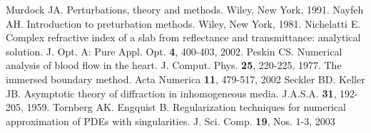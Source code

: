 \documentclass[12pt,twoside]{report}
\begin{document}
\begin{thebibliography}{2d}
Murdock JA. Perturbations, theory and methods. Wiley, New York, 1991.
Nayfeh AH. Introduction to preturbation methods. Wiley, New York, 1981.
Nichelatti E. Complex refractive index of a slab from reflectance and transmittance: analytical solution. J. Opt. A: Pure Appl. Opt. \textbf{4}, 400-403, 2002.
Peskin CS. Numerical analysis of blood flow in the heart. J. Comput. Phys. \textbf{25}, 220-225, 1977.
The immersed boundary method. Acta Numerica \textbf{11}, 479-517, 2002
Seckler BD. Keller JB. Asymptotic theory of diffraction in inhomogeneous media. J.A.S.A. \textbf{31}, 192-205, 1959.  
Tornberg AK. Engquist B. Regularization techniques for numerical approximation of PDEs with singularities. J. Sci. Comp. \textbf{19}, Nos. 1-3, 2003
\end{thebibliography}

 














\newpage
\end{document}

